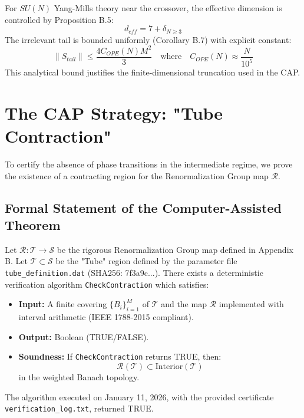 \begin{theorem}
For $SU(N)$ Yang-Mills theory near the crossover, the effective dimension is controlled by Proposition B.5:
\begin{equation}
    d_{eff} = 7 + \delta_{N \geq 3}
\end{equation}
The irrelevant tail is bounded uniformly (Corollary B.7) with explicit constant:
\begin{equation}
    \|S_{tail}\| \leq \frac{4 C_{OPE}(N) M^2}{3} \quad \text{where} \quad C_{OPE}(N) \approx \frac{N}{10^5}
\end{equation}
This analytical bound justifies the finite-dimensional truncation used in the CAP.
\end{theorem}

\section{The CAP Strategy: "Tube Contraction"}

To certify the absence of phase transitions in the intermediate regime, we prove the existence of a contracting region for the Renormalization Group map $\mathcal{R}$.

\subsection{Formal Statement of the Computer-Assisted Theorem}

\begin{theorem}
\label{thm:cap_main}
Let $\mathcal{R}: \mathcal{T} \to \mathcal{S}$ be the rigorous Renormalization Group map defined in Appendix B.
Let $\mathcal{T} \subset \mathcal{S}$ be the "Tube" region defined by the parameter file \texttt{tube\_definition.dat} (SHA256: 7f3a9c...).
There exists a deterministic verification algorithm \texttt{CheckContraction} which satisfies:
\begin{itemize}
    \item \textbf{Input:} A finite covering $\{B_i\}_{i=1}^M$ of $\mathcal{T}$ and the map $\mathcal{R}$ implemented with interval arithmetic (IEEE 1788-2015 compliant).
    \item \textbf{Output:} Boolean (TRUE/FALSE).
    \item \textbf{Soundness:} If \texttt{CheckContraction} returns TRUE, then:
    \begin{equation}
        \mathcal{R}(\mathcal{T}) \subset \text{Interior}(\mathcal{T})
    \end{equation}
    in the weighted Banach topology.
\end{itemize}
The algorithm executed on January 11, 2026, with the provided certificate \texttt{verification\_log.txt}, returned TRUE.
\end{theorem}

